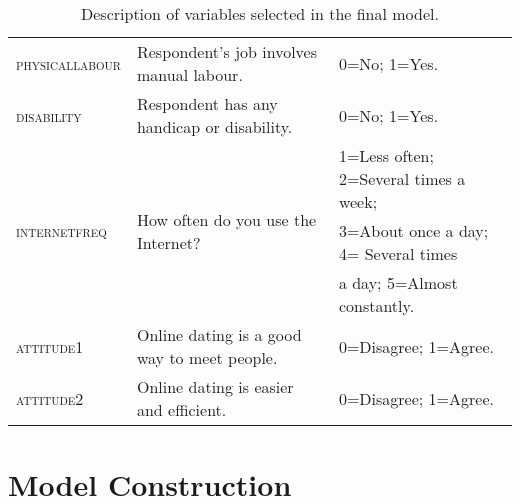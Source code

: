 \begin{sidewaystable}
\begin{minipage}[t]{1\columnwidth}
\begin{center}
\begin{tabular}{lll}
\textsc{\small{}physicallabour} & {\small{}Respondent's job involves manual labour.} & {\small{}0=No; 1=Yes.}\tabularnewline
\textsc{\small{}disability} & {\small{}Respondent has any handicap or disability.} & {\small{}0=No; 1=Yes.}\tabularnewline
\multirow{3}{*}{\textsc{\small{}internetfreq}} & \multirow{3}{*}{{\small{}How often do you use the Internet?}} & {\small{}1=Less often; 2=Several times a week;}\tabularnewline
 &  & {\small{}3=About once a day; 4= Several times}\tabularnewline
 &  & {\small{}a day; 5=Almost constantly.}\tabularnewline
\textsc{\small{}attitude1} & {\small{}Online dating is a good way to meet people.} & {\small{}0=Disagree; 1=Agree.}\tabularnewline
\textsc{\small{}attitude2} & {\small{}Online dating is easier and efficient.} & {\small{}0=Disagree; 1=Agree.}\tabularnewline
\hline 
\end{tabular}
\par\end{center}
\begin{center}
\caption{Description of variables selected in the final model.\label{tab:Description-of-variables-selected}}
\par\end{center}%
\end{minipage}
\end{sidewaystable}
\clearpage{}\pagestyle{fancy}

\section{Model Construction}

